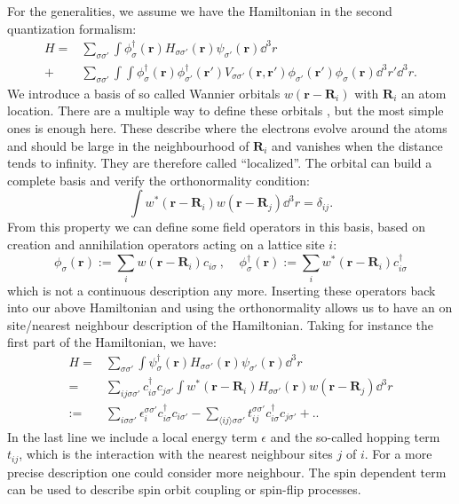 \documentclass[../main.tex]{subfile}
\begin{document}
For the generalities, we assume we have the Hamiltonian in the second quantization formalism:
\begin{align*}
    H = & \sum_{\sigma\sigma'} \int \phi_{\sigma}^{\dagger}(\bm{r}) H_{\sigma\sigma'}(\bm{r}) \psi_{\sigma'}(\bm{r}) \dd^3r\\
    + & \sum_{\sigma\sigma'} \int \int \phi_{\sigma}^{\dagger}(\bm{r})\phi_{\sigma'}^{\dagger}(\bm{r}') V_{\sigma\sigma'}(\bm{r},\bm{r}')
     \phi_{\sigma'}(\bm{r}')\phi_{\sigma}(\bm{r}) \dd^3r'\dd^3r.
\end{align*}
We introduce a basis of so called Wannier orbitals $w(\bm{r} - \bm{R}_i)$ with $\bm{R}_i$ an atom location. There are a multiple way to define these orbitals \cite{Marzari},
but the most simple ones \cite{Wannier1937} is enough here. These describe where the electrons evolve around the atoms and should be large
 in the neighbourhood of $\bm{R}_i$ and vanishes when the distance tends to infinity.
They are therefore called ``localized''. The orbital can build a complete basis and verify the orthonormality condition:
\[
    \int w^{\ast}(\bm{r} - \bm{R}_i) w(\bm{r} - \bm{R}_j) \dd^3r = \delta_{ij}.
\]
From this property we can define some field operators in this basis, based on creation and annihilation operators acting on a lattice site $i$:
\begin{equation}\label{eq:Wannier_fieldOp}
    \phi_{\sigma}(\bm{r}) := \sum_{i} w(\bm{r} - \bm{R}_i) c_{i\sigma} ~,~~~~~ \phi_{\sigma}^{\dagger}(\bm{r}) := \sum_{i} w^{\ast}(\bm{r} - \bm{R}_i) c_{i\sigma}^{\dagger}
\end{equation}
which is not a continuous description any more. 
Inserting these operators back into our above Hamiltonian and using the orthonormality allows us to have an on site/nearest neighbour description of the Hamiltonian. Taking for
instance the first part of the Hamiltonian, we have:
\begin{align*}
    H = & \sum_{\sigma\sigma'} \int \psi_{\sigma}^{\dagger}(\bm{r}) H_{\sigma\sigma'}(\bm{r}) \psi_{\sigma'}(\bm{r}) \dd^3r\\
    =& \sum_{ij\sigma\sigma'} c_{i\sigma}^{\dagger} c_{j\sigma'}\int w^{\ast}(\bm{r} - \bm{R}_i) H_{\sigma\sigma'}(\bm{r}) w(\bm{r} - \bm{R}_j) \dd^3r\\
    := & \sum_{i\sigma\sigma'} \epsilon_i^{\sigma\sigma'} c_{i\sigma}^{\dagger} c_{i\sigma'} - \sum_{\langle ij\rangle\sigma\sigma'} t_{ij}^{\sigma\sigma'} c_{i\sigma}^{\dagger} c_{j\sigma'} + ..   
\end{align*}
In the last line we include a local energy term $\epsilon$ and the so-called hopping term $t_{ij}$, which is the interaction with the nearest neighbour sites $j$ of $i$.
For a more precise description one could consider more neighbour. The spin dependent term can be used to describe spin orbit coupling or spin-flip processes.\\
\end{document}

